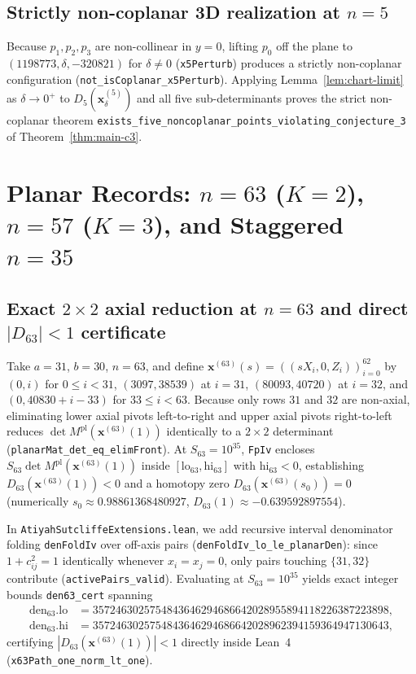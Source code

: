 \documentclass[11pt,reqno]{amsart}
\theoremstyle{remark}
\begin{document}
\subsection{Strictly non-coplanar 3D realization at $n = 5$}\label{sec:n5-3d}
Because $p_1, p_2, p_3$ are non-collinear in $y = 0$, lifting $p_0$ off the plane to $(1198773, \delta, -320821)$ for $\delta \ne 0$ (\texttt{x5Perturb}) produces a strictly non-coplanar configuration (\texttt{not\_isCoplanar\_x5Perturb}).
Applying Lemma~\ref{lem:chart-limit} as $\delta \to 0^+$ to $D_5(\mathbf{x}^{(5)}_\delta)$ and all five sub-determinants proves the strict non-coplanar theorem \texttt{exists\_five\_noncoplanar\_points\_violating\_conjecture\_3} of Theorem~\ref{thm:main-c3}.

\section{Planar Records: $n = 63$ ($K=2$), $n = 57$ ($K=3$), and Staggered $n = 35$}\label{sec:planar}

\subsection{Exact $2 \times 2$ axial reduction at $n = 63$ and direct $|D_{63}| < 1$ certificate}\label{sec:n63}
Take $a = 31$, $b = 30$, $n = 63$, and define $\mathbf{x}^{(63)}(s) = ((s X_i, 0, Z_i))_{i=0}^{62}$ by $(0, i)$ for $0 \le i < 31$, $(3097, 38539)$ at $i = 31$, $(80093, 40720)$ at $i = 32$, and $(0, 40830 + i - 33)$ for $33 \le i < 63$.
Because only rows $31$ and $32$ are non-axial, eliminating lower axial pivots left-to-right and upper axial pivots right-to-left reduces $\det M^{\mathrm{pl}}(\mathbf{x}^{(63)}(1))$ identically to a $2 \times 2$ determinant (\texttt{planarMat\_det\_eq\_elimFront}).
At $S_{63} = 10^{35}$, \texttt{FpIv} encloses $S_{63} \det M^{\mathrm{pl}}(\mathbf{x}^{(63)}(1))$ inside $[\mathrm{lo}_{63}, \mathrm{hi}_{63}]$ with $\mathrm{hi}_{63} < 0$, establishing $D_{63}(\mathbf{x}^{(63)}(1)) < 0$ and a homotopy zero $D_{63}(\mathbf{x}^{(63)}(s_0)) = 0$ (numerically $s_0 \approx 0.98861368480927$, $D_{63}(1) \approx -0.639592897554$).

In \texttt{AtiyahSutcliffeExtensions.lean}, we add recursive interval denominator folding \texttt{denFoldIv} over off-axis pairs (\texttt{denFoldIv\_lo\_le\_planarDen}): since $1 + c_{ij}^2 = 1$ identically whenever $x_i = x_j = 0$, only pairs touching $\{31, 32\}$ contribute (\texttt{activePairs\_valid}).
Evaluating at $S_{63} = 10^{35}$ yields exact integer bounds \texttt{den63\_cert} spanning
{\scriptsize
\begin{align*}
  \mathrm{den}_{63}.\mathrm{lo} &= 3572463025754843646294686642028955894118226387223898, \\
  \mathrm{den}_{63}.\mathrm{hi} &= 3572463025754843646294686642028962394159364947130643,
\end{align*}
}%
certifying $|D_{63}(\mathbf{x}^{(63)}(1))| < 1$ directly inside Lean~4 (\texttt{x63Path\_one\_norm\_lt\_one}).
\end{document}
